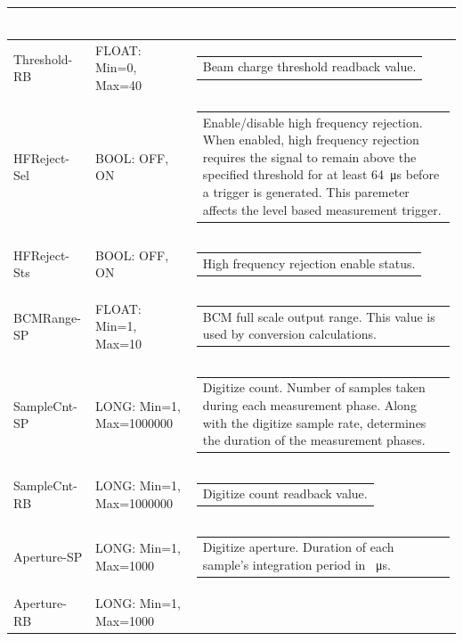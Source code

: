 \documentclass[openany]{article}
\begin{document}
\begin{longtable}{| m{3.0cm} m{4.5cm} m{7.0cm} |}
\begin{tabular}{@{}m{6cm}@{}}
						\end{tabular} \\ \hline
		Threshold-RB & FLOAT: Min=0, Max=40 & \begin{tabular}{@{}m{6cm}@{}}
	    					Beam charge threshold readback value.
						\end{tabular} \\ \hline
		HFReject-Sel & BOOL: OFF, ON & \begin{tabular}{@{}m{6cm}@{}}
	    					Enable/disable high frequency rejection. When enabled, high frequency rejection requires the signal to remain above the specified threshold for at least \SI{64}{\micro\second} before a trigger is generated. This paremeter affects the level based measurement trigger.
						\end{tabular} \\ \hline
		HFReject-Sts & BOOL: OFF, ON & \begin{tabular}{@{}m{6cm}@{}}
	    					High frequency rejection enable status.
						\end{tabular} \\ \hline
		BCMRange-SP & FLOAT: Min=1, Max=10 & \begin{tabular}{@{}m{6cm}@{}}
	    					BCM full scale output range. This value is used by conversion calculations.
						\end{tabular} \\ \hline
		SampleCnt-SP & LONG: Min=1, Max=1000000 & \begin{tabular}{@{}m{6cm}@{}}
	    					Digitize count. Number of samples taken during each measurement phase. Along with the digitize sample rate, determines the duration of the measurement phases.
						\end{tabular} \\ \hline
		SampleCnt-RB & LONG: Min=1, Max=1000000 & \begin{tabular}{@{}m{6cm}@{}}
	    					Digitize count readback value.
						\end{tabular} \\ \hline
		Aperture-SP & LONG: Min=1, Max=1000 & \begin{tabular}{@{}m{6cm}@{}}
	    					Digitize aperture. Duration of each sample's integration period in \SI{}{\micro\second}.
						\end{tabular} \\ \hline
		Aperture-RB & LONG: Min=1, Max=1000 & \begin{tabular}{@{}m{6cm}@{}}

\end{tabular}
\end{longtable}
\end{document}
